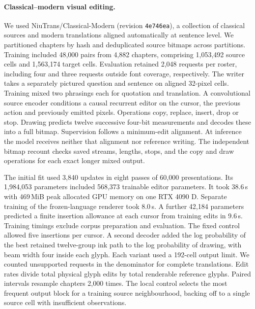 \documentclass[12pt,a4paper]{article}
\providecommand{\DIFadd}[1]{{\protect\color{blue} \sf #1}} %
\begin{document}
\paragraph{\DIFadd{Classical--modern visual editing.}}
\DIFadd{We used NiuTrans/Classical-Modern (revision \texttt{4e746ea}), a collection of classical sources and modern translations aligned automatically at sentence level. We partitioned chapters by hash and deduplicated source bitmaps across partitions. Training included 48,000 pairs from 4,882 chapters, comprising 1,053,492 source cells and 1,563,174 target cells. Evaluation retained 2,048 requests per roster, including four and three requests outside font coverage, respectively. The writer takes a separately pictured question and sentence on aligned 32-pixel cells. Training mixed two phrasings each for quotation and translation. A convolutional source encoder conditions a causal recurrent editor on the cursor, the previous action and previously emitted pixels. Operations copy, replace, insert, drop or stop. Drawing predicts twelve successive four-bit measurements and decodes these into a full bitmap. Supervision follows a minimum-edit alignment. At inference the model receives neither that alignment nor reference writing. The independent bitmap recount checks saved streams, lengths, stops, and the copy and draw operations for each exact longer mixed output.
}

\DIFadd{The initial fit used 3,840 updates in eight passes of 60,000 presentations. Its 1,984,053 parameters included 568,373 trainable editor parameters. It took 38.6\,s with 469\,MiB peak allocated GPU memory on one RTX 4090 D. Separate training of the frozen-language renderer took 8.0\,s. A further 42,184 parameters predicted a finite insertion allowance at each cursor from training edits in 9.6\,s. Training timings exclude corpus preparation and evaluation. The fixed control allowed five insertions per cursor. A second decoder added the log probability of the best retained twelve-group ink path to the log probability of drawing, with beam width four inside each glyph. Each variant used a 192-cell output limit. We counted unsupported requests in the denominator for complete translations. Edit rates divide total physical glyph edits by total renderable reference glyphs. Paired intervals resample chapters 2,000 times. The local control selects the most frequent output block for a training source neighbourhood, backing off to a single source cell with insufficient observations.
}
\end{document}

